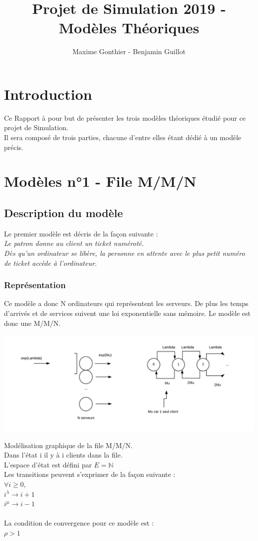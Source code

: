 \documentclass[a4paper,11pt]{article}
\title{Projet de Simulation 2019 - Modèles Théoriques}
\author{Maxime Gonthier - Benjamin Guillot}
\begin{document}
\clearpage
\maketitle

\newpage
\tableofcontents

\newpage
\section{Introduction}
	Ce Rapport à pour but de présenter les trois modèles théoriques étudié pour ce projet de Simulation.\\
	Il sera composé de trois parties, chacune d'entre elles étant dédié à un modèle précis.
\section{Modèles n°1 - File M/M/N}
	\subsection{Description du modèle}
	Le premier modèle est décris de la façon suivante :\\
	\textit{Le patron donne au client un ticket numéroté.\\
			Dès qu'un ordinateur se libère, la personne en attente avec le plus petit numéro de ticket accède à l'ordinateur.}
		\subsubsection{Représentation}
			Ce modèle a donc N ordinateurs qui représentent les serveurs. De plus les temps d'arrivés et de services 
			suivent une loi exponentielle sans mémoire. Le modèle est donc une M/M/N.\\
		\centerline{\includegraphics[scale=0.5]{MMN.png}}
		Modélisation graphique de la file M/M/N.\\
		Dans l'état i il y à i clients dans la file.\\
		L'espace d'état est défini par $E=\pmb{\mathbb{N}}$\\
		Les transitions peuvent s'exprimer de la façon suivante :\\
		$\forall i \ge 0,$\\
		$i^{\lambda} \to i + 1 $\\
		$i^{\mu} \to i - 1$\\
		\\
		La condition de convergence pour ce modèle est :\\
		$\rho > 1$
\end{document}
